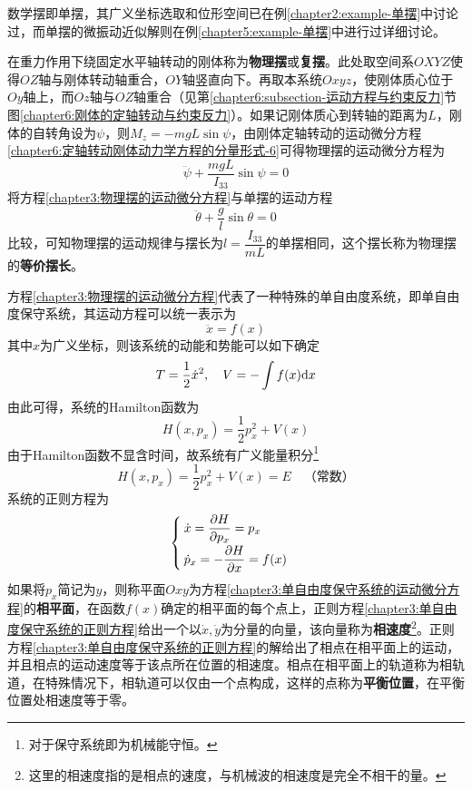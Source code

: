 数学摆即单摆，其广义坐标选取和位形空间已在例\ref{chapter2:example-单摆}中讨论过，而单摆的微振动近似解则在例\ref{chapter5:example-单摆}中进行过详细讨论。

在重力作用下绕固定水平轴转动的刚体称为{\bf 物理摆}或{\bf 复摆}。此处取空间系$OXYZ$使得$OZ$轴与刚体转动轴重合，$OY$轴竖直向下。再取本系统$Oxyz$，使刚体质心位于$Oy$轴上，而$Oz$轴与$OZ$轴重合（见第\ref{chapter6:subsection-运动方程与约束反力}节图\ref{chapter6:刚体的定轴转动与约束反力}）。如果记刚体质心到转轴的距离为$L$，刚体的自转角设为$\psi$，则$M_z=-mgL\sin\psi$，由刚体定轴转动的运动微分方程\eqref{chapter6:定轴转动刚体动力学方程的分量形式-6}可得物理摆的运动微分方程为
\begin{equation}
	\ddot{\psi}+\frac{mgL}{I_{33}}\sin\psi = 0
	\label{chapter3:物理摆的运动微分方程}
\end{equation}
将方程\eqref{chapter3:物理摆的运动微分方程}与单摆的运动方程
\begin{equation*}
	\ddot{\theta} + \frac{g}{l} \sin\theta = 0
\end{equation*}
比较，可知物理摆的运动规律与摆长为$l=\dfrac{I_{33}}{mL}$的单摆相同，这个摆长称为物理摆的{\bf 等价摆长}。

方程\eqref{chapter3:物理摆的运动微分方程}代表了一种特殊的单自由度系统，即单自由度保守系统，其运动方程可以统一表示为
\begin{equation}
	\ddot{x} = f(x)
	\label{chapter3:单自由度保守系统的运动微分方程}
\end{equation}
其中$x$为广义坐标，则该系统的动能和势能可以如下确定
\begin{equation}
	T = \frac12 \dot{x}^2 ,\quad V = -\int f(x)\mathrm{d} x
\end{equation}
由此可得，系统的Hamilton函数为
\begin{equation}
	H(x,p_x) = \frac12 p_x^2 + V(x)
\end{equation}
由于Hamilton函数不显含时间，故系统有广义能量积分\footnote{对于保守系统即为机械能守恒。}
\begin{equation}
	H(x,p_x) = \frac12 p_x^2 + V(x) = E\quad \text{（常数）}
	\label{chapter3:单自由度保守系统的广义能量积分}
\end{equation}
系统的正则方程为
\begin{equation}
\begin{cases}
	\dot{x} = \dfrac{\partial H}{\partial p_x} = p_x \\[1.5ex]
	\dot{p}_x = -\dfrac{\partial H}{\partial x} = f(x)
\end{cases}
\label{chapter3:单自由度保守系统的正则方程}
\end{equation}
如果将$p_x$简记为$y$，则称平面$Oxy$为方程\eqref{chapter3:单自由度保守系统的运动微分方程}的{\bf 相平面}，在函数$f(x)$确定的相平面的每个点上，正则方程\eqref{chapter3:单自由度保守系统的正则方程}给出一个以$\dot{x},\dot{y}$为分量的向量，该向量称为{\bf 相速度}\footnote{这里的相速度指的是相点的速度，与机械波的相速度是完全不相干的量。}。正则方程\eqref{chapter3:单自由度保守系统的正则方程}的解给出了相点在相平面上的运动，并且相点的运动速度等于该点所在位置的相速度。相点在相平面上的轨道称为相轨道，在特殊情况下，相轨道可以仅由一个点构成，这样的点称为{\bf 平衡位置}，在平衡位置处相速度等于零。

